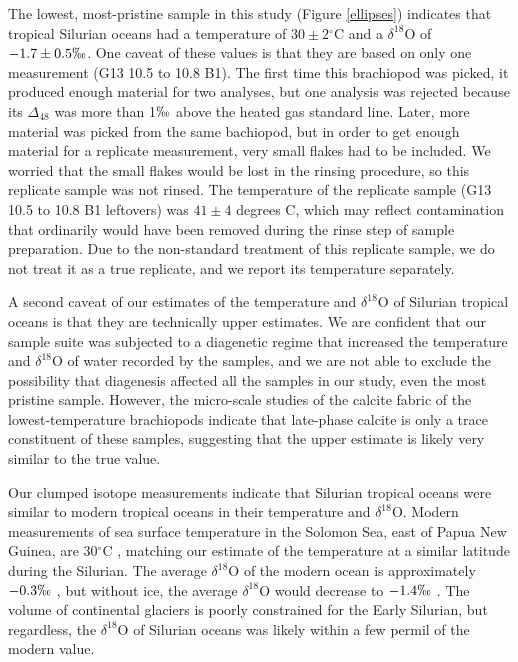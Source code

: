 \documentclass{article}
\newcommand{\deltao}{$\delta^{18}$}
\newcommand{\degrees}{$^{\circ}$}
\begin{document}
The lowest, most-pristine sample in this study (Figure \ref{ellipses}) indicates that tropical Silurian oceans had a temperature of $30\pm 2$\degrees C and a \deltao O of $-1.7\pm 0.5\permil$. One caveat of these values is that they are based on only one measurement (G13 10.5 to 10.8 B1). The first time this brachiopod was picked, it produced enough material for two analyses, but one analysis was rejected because its $\Delta_{48}$ was more than 1$\permil$ above the heated gas standard line. Later, more material was picked from the same bachiopod, but in order to get enough material for a replicate measurement, very small flakes had to be included. We worried that the small flakes would be lost in the rinsing procedure, so this replicate sample was not rinsed. The temperature of the replicate sample (G13 10.5 to 10.8 B1 leftovers) was $41\pm 4$ degrees C, which may reflect contamination that ordinarily would have been removed during the rinse step of sample preparation. Due to the non-standard treatment of this replicate sample, we do not treat it as a true replicate, and we report its temperature separately. 

A second caveat of our estimates of the temperature and \deltao O of Silurian tropical oceans is that they are technically upper estimates. We are confident that our sample suite was subjected to a diagenetic regime that increased the temperature and \deltao O of water recorded by the samples, and we are not able to exclude the possibility that diagenesis affected all the samples in our study, even the most pristine sample. However, the micro-scale studies of the calcite fabric of the lowest-temperature brachiopods indicate that late-phase calcite is only a trace constituent of these samples, suggesting that the upper estimate is likely very similar to the true value. 

Our clumped isotope measurements indicate that Silurian tropical oceans were similar to modern tropical oceans in their temperature and \deltao O. Modern measurements of sea surface temperature in the Solomon Sea, east of Papua New Guinea, are 30\degrees C \citep{Reynolds1994}, matching our estimate of the temperature at a similar latitude during the Silurian. The average \deltao O of the modern ocean is approximately $-0.3\permil$ \citep{Shackleton1974}, but without ice, the average \deltao O would decrease to $-1.4\permil$ \citep{Lhomme2005}. The volume of continental glaciers is poorly constrained for the Early Silurian, but regardless, the \deltao O of Silurian oceans was likely within a few permil of the modern value. 
\end{document}
